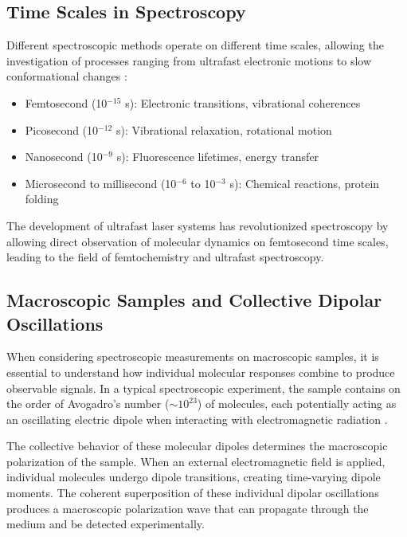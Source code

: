 \subsection{Time Scales in Spectroscopy}
\label{subsec:time_scales}

\noindent Different spectroscopic methods operate on different time scales, allowing the investigation of processes ranging from ultrafast electronic motions to slow conformational changes \cite{BogaczEtAl2025XrayAbsorptionSpectroscopy, FullerOgilvie2015ExperimentalImplementationsTwodimensional}:

\begin{itemize}
    \item Femtosecond (10$^{-15}$ s): Electronic transitions, vibrational coherences
    \item Picosecond (10$^{-12}$ s): Vibrational relaxation, rotational motion
    \item Nanosecond (10$^{-9}$ s): Fluorescence lifetimes, energy transfer
    \item Microsecond to millisecond (10$^{-6}$ to 10$^{-3}$ s): Chemical reactions, protein folding
\end{itemize}

\noindent The development of ultrafast laser systems has revolutionized spectroscopy by allowing direct observation of molecular dynamics on femtosecond time scales, leading to the field of femtochemistry and ultrafast spectroscopy.

\subsection{Macroscopic Samples and Collective Dipolar Oscillations}
\label{subsec:macroscopic_samples}

\noindent When considering spectroscopic measurements on macroscopic samples, it is essential to understand how individual molecular responses combine to produce observable signals. In a typical spectroscopic experiment, the sample contains on the order of Avogadro's number ($\sim 10^{23}$) of molecules, each potentially acting as an oscillating electric dipole when interacting with electromagnetic radiation \cite{Feynman1965FeynmanLecturesPhysics}.

\noindent The collective behavior of these molecular dipoles determines the macroscopic polarization of the sample. When an external electromagnetic field is applied, individual molecules undergo dipole transitions, creating time-varying dipole moments. The coherent superposition of these individual dipolar oscillations produces a macroscopic polarization wave that can propagate through the medium and be detected experimentally.

